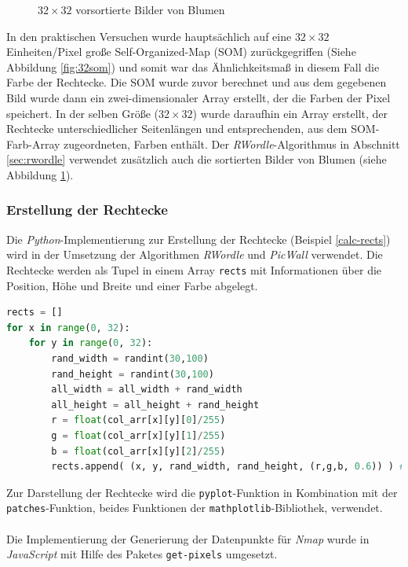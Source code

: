 \documentclass[12pt, ngerman, utf8]{article}
\begin{document}
\begin{figure}[h]
\begin{minipage}{.55\textwidth}
  \caption{$32\times32$ vorsortierte Bilder von Blumen}
  \label{fig:32flowers}
\end{minipage}
\end{figure}
In den praktischen Versuchen wurde hauptsächlich auf eine  $32\times32$ Einheiten/Pixel große Self-Organized-Map (SOM) zurückgegriffen (Siehe Abbildung \ref{fig:32som}) und somit war das Ähnlichkeitsmaß in diesem Fall die Farbe der Rechtecke. 
Die SOM wurde zuvor berechnet und aus dem gegebenen Bild wurde dann ein zwei-dimensionaler Array erstellt, der die Farben der Pixel speichert. In der selben Größe ($32\times32$) wurde daraufhin ein Array erstellt, der Rechtecke  unterschiedlicher Seitenlängen und entsprechenden, aus dem SOM-Farb-Array zugeordneten, Farben enthält. Der \emph{RWordle}-Algorithmus in Abschnitt \ref{sec:rwordle} verwendet zusätzlich auch die sortierten Bilder von Blumen (siehe Abbildung \ref{fig:32flowers}).

\subsubsection{Erstellung der Rechtecke}
Die \emph{Python}-Implementierung zur Erstellung der Rechtecke (Beispiel \ref{calc-rects}) wird in der Umsetzung der Algorithmen \emph{RWordle} und \emph{PicWall} verwendet. Die Rechtecke werden als Tupel in einem Array \texttt{rects} mit Informationen über die Position, Höhe und Breite und einer Farbe abgelegt.\\
\begin{lstlisting}[language=Python, caption={Erstellung der Rechtecke; \texttt{col\_arr} enthält die Farben aus der SOM},label=calc-rects]
rects = []
for x in range(0, 32):
    for y in range(0, 32):
        rand_width = randint(30,100)
        rand_height = randint(30,100)
        all_width = all_width + rand_width
        all_height = all_height + rand_height
        r = float(col_arr[x][y][0]/255)
        g = float(col_arr[x][y][1]/255)
        b = float(col_arr[x][y][2]/255)
        rects.append( (x, y, rand_width, rand_height, (r,g,b, 0.6)) ) #alpha 0.6
\end{lstlisting}
Zur Darstellung der Rechtecke wird die \texttt{pyplot}-Funktion in Kombination mit der \texttt{patches}-Funktion, beides Funktionen der \texttt{mathplotlib}-Bibliothek, verwendet.\\\\
Die Implementierung der Generierung der Datenpunkte für \textit{Nmap} wurde in \emph{JavaScript} mit Hilfe des Paketes \texttt{get-pixels} \cite{npm-get-pixels} umgesetzt. 
\end{document}
